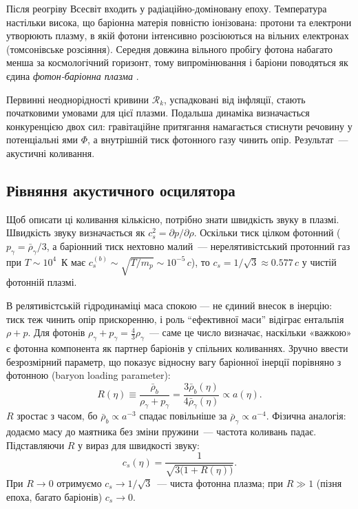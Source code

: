 \documentclass[12pt, a4paper]{article}
\begin{document}
Після реогріву Всесвіт входить у радіаційно-доміновану епоху.
Температура настільки висока, що баріонна матерія повністю
іонізована: протони та електрони утворюють плазму, в якій
фотони інтенсивно розсіюються на вільних електронах
(томсонівське розсіяння). Середня довжина вільного пробігу
фотона набагато менша за космологічний горизонт, тому
випромінювання і баріони поводяться як єдина
\emph{фотон-баріонна плазма} \cite{mukhanov_2005}.

Первинні неоднорідності кривини $\mathcal{R}_k$, успадковані
від інфляції, стають початковими умовами для цієї плазми.
Подальша динаміка визначається конкуренцією двох сил:
гравітаційне притягання намагається стиснути речовину у
потенціальні ями $\Phi$, а внутрішній тиск фотонного газу
чинить опір. Результат~--- акустичні коливання.

\subsection{Рівняння акустичного осцилятора}

Щоб описати ці коливання кількісно, потрібно знати
швидкість звуку в плазмі.
Швидкість звуку визначається як $c_s^2 = \partial p/\partial\rho$.
Оскільки тиск цілком фотонний ($p_\gamma = \bar{\rho}_\gamma/3$,
а баріонний тиск нехтовно малий~--- нерелятивістський протонний
газ при $T \sim 10^4$~К має $c_s^{(b)} \sim \sqrt{T/m_p}
\sim 10^{-5}\,c$), то $c_s = 1/\sqrt{3} \approx 0.577\,c$
у чистій фотонній плазмі.

В релятивістській гідродинаміці маса спокою --- не єдиний
внесок в інерцію: тиск теж чинить опір прискоренню, і
роль \enquote{ефективної маси} відіграє ентальпія $\rho + p$.
Для фотонів $\rho_\gamma + p_\gamma = \tfrac{4}{3}\rho_\gamma$~---
саме це число визначає, наскільки «важкою» є фотонна компонента
як партнер баріонів у спільних коливаннях. Зручно ввести
безрозмірний параметр, що показує відносну вагу баріонної
інерції порівняно з фотонною (baryon loading parameter):
\begin{equation*}
  R(\eta) \equiv
    \frac{\bar{\rho}_b}{\rho_\gamma + p_\gamma}
    = \frac{3\bar{\rho}_b(\eta)}{4\bar{\rho}_\gamma(\eta)}
    \propto a(\eta).
\end{equation*}
$R$ зростає з часом, бо $\bar{\rho}_b \propto a^{-3}$
спадає повільніше за $\bar{\rho}_\gamma \propto a^{-4}$.
Фізична аналогія: додаємо масу до маятника без зміни
пружини~--- частота коливань падає.
Підставляючи $R$ у вираз для швидкості звуку:
\begin{equation}\label{eq:sound_speed}
  c_s(\eta) = \frac{1}{\sqrt{3\bigl(1 + R(\eta)\bigr)}}.
\end{equation}
При $R \to 0$ отримуємо $c_s \to 1/\sqrt{3}$~--- чиста
фотонна плазма; при $R \gg 1$ (пізня епоха, багато баріонів)
$c_s \to 0$.
\end{document}

